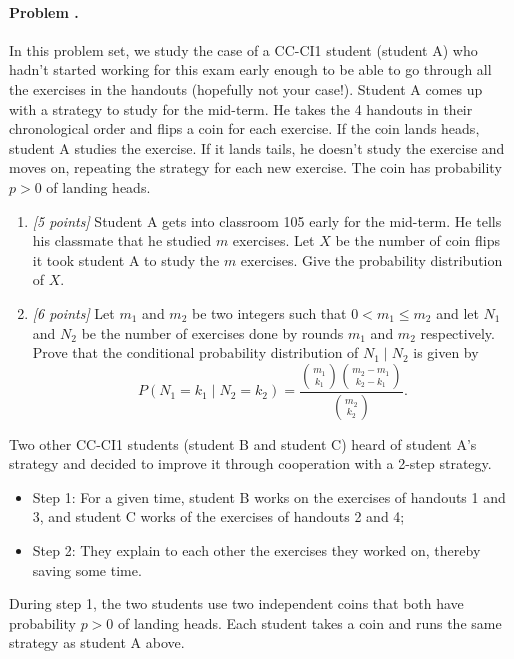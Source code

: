 \documentclass[article,12pt,a4paper]{article}
\newcounter{num}  %
\begin{document}
		\paragraph{Problem \thenum.}
		In this problem set, we study the case of a CC-CI1 student (student A) who hadn't started working for this exam early enough to be able to go through all the exercises in the handouts (hopefully not your case!).
		Student A comes up with a strategy to study for the mid-term. 
		He takes the 4 handouts in their chronological order and flips a coin for each exercise. 
		If the coin lands heads, student A studies the exercise. 
		If it lands tails, he doesn't study the exercise and moves on, repeating the strategy for each new exercise.
		The coin has probability $p>0$ of landing heads.
		\begin{enumerate}
			\item \textit{[5 points]} Student A gets into classroom 105 early for the mid-term. 
			He tells his classmate that he studied $m$ exercises.
			Let $X$ be the number of coin flips it took student A to study the $m$ exercises. Give the probability distribution of $X$. 
			
			\vspace{5cm}
			
			\item \textit{[6 points]} Let $m_1$ and $m_2$ be two integers such that $0<m_1\leq m_2$ and let $N_1$ and $N_2$ be the number of exercises done by rounds $m_1$ and $m_2$ respectively. Prove that the conditional probability distribution of $N_1 \mid N_2$ is given by
			\begin{equation}
				P(N_1=k_1 \mid N_2=k_2) = \frac{\binom{m_1}{k_1}\binom{m_2-m_1}{k_2-k_1}}{\binom{m_2}{k_2}}.
			\end{equation} 
			
			
		\end{enumerate}
		
		
		\newpage
		
		Two other CC-CI1 students (student B and student C) heard of student A's strategy and decided to improve it through cooperation with a 2-step strategy.
		\begin{itemize}
			\item Step 1: For a given time, student B works on the exercises of handouts 1 and 3, and student C works of the exercises of handouts 2 and 4;
			\item Step 2: They explain to each other the exercises they worked on, thereby saving some time. 
		\end{itemize}
		During step 1, the two students use two independent coins that both have probability $p>0$ of landing heads.
		Each student takes a coin and runs the same strategy as student A above.
		
\end{document}
